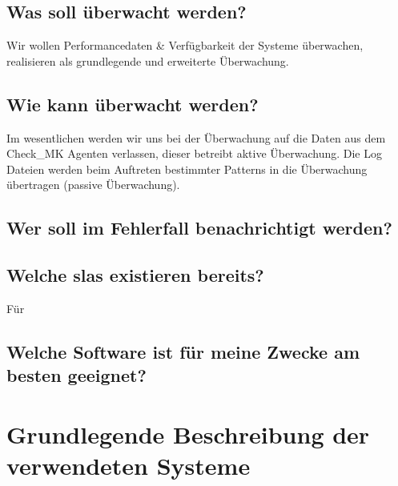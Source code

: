 \documentclass[12pt,a4paper,parskip,listof=totoc,bibliography=totoc]{scrreprt}
\begin{document}
	\subsection{Was soll überwacht werden?}
	Wir wollen Performancedaten \& Verfügbarkeit der Systeme überwachen, realisieren als grundlegende und erweiterte Überwachung.
	\subsection{Wie kann überwacht werden?}
	Im wesentlichen werden wir uns bei der Überwachung auf die Daten aus dem Check\_MK Agenten verlassen, dieser betreibt aktive Überwachung.
	Die Log Dateien werden beim Auftreten bestimmter Patterns in die Überwachung übertragen (passive Überwachung). 
	\subsection{Wer soll im Fehlerfall benachrichtigt werden?}
	
	\subsection{Welche \acrlong{sla}s existieren bereits?}
	Für 
	\subsection{Welche Software ist für meine Zwecke am besten geeignet?}
	\section{Grundlegende Beschreibung der verwendeten Systeme}
\end{document}
